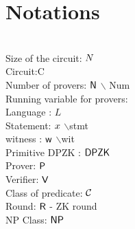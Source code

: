 \section{Notations}
\\
Size of the circuit: $N$\\
Circuit:C\\
Number of provers: $\mathsf{N}$ $\backslash$ Num\\
Running variable for provers:\\
Language : $L$\\
Statement: ${x}$ $\backslash$stmt\\
witness : $\mathsf{w}$ $\backslash$wit\\
Primitive DPZK : $\mathsf{DPZK}$\\
Prover: $\mathsf{P}$\\
Verifier: $\mathsf{V}$\\
Class of predicate: ${\mathcal{C}}$\\
Round: $\mathsf{R}$ - ZK round\\
NP Class: $\mathsf{NP}$\\